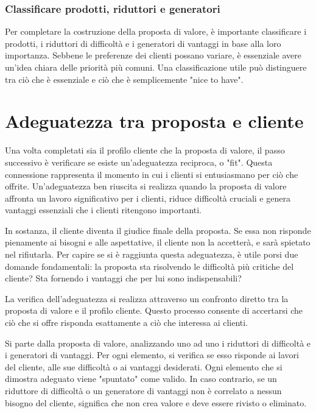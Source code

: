 \subsubsection{Classificare prodotti, riduttori e generatori}
Per completare la costruzione della proposta di valore, è importante classificare i prodotti, i riduttori di difficoltà e i generatori di vantaggi in base alla loro importanza. Sebbene le preferenze dei clienti possano variare, è essenziale avere un'idea chiara delle priorità più comuni. Una classificazione utile può distinguere tra ciò che è essenziale e ciò che è semplicemente "nice to have".

\section{Adeguatezza tra proposta e cliente}
Una volta completati sia il profilo cliente che la proposta di valore, il passo successivo è verificare se esiste un'adeguatezza reciproca, o "fit". Questa connessione rappresenta il momento in cui i clienti si entusiasmano per ciò che offrite. Un'adeguatezza ben riuscita si realizza quando la proposta di valore affronta un lavoro significativo per i clienti, riduce difficoltà cruciali e genera vantaggi essenziali che i clienti ritengono importanti.

In sostanza, il cliente diventa il giudice finale della proposta. Se essa non risponde pienamente ai bisogni e alle aspettative, il cliente non la accetterà, e sarà spietato nel rifiutarla. Per capire se si è raggiunta questa adeguatezza, è utile porsi due domande fondamentali: la proposta sta risolvendo le difficoltà più critiche del cliente? Sta fornendo i vantaggi che per lui sono indispensabili?

La verifica dell’adeguatezza si realizza attraverso un confronto diretto tra la proposta di valore e il profilo cliente. Questo processo consente di accertarsi che ciò che si offre risponda esattamente a ciò che interessa ai clienti.

Si parte dalla proposta di valore, analizzando uno ad uno i riduttori di difficoltà e i generatori di vantaggi. Per ogni elemento, si verifica se esso risponde ai lavori del cliente, alle sue difficoltà o ai vantaggi desiderati. Ogni elemento che si dimostra adeguato viene "spuntato" come valido. In caso contrario, se un riduttore di difficoltà o un generatore di vantaggi non è correlato a nessun bisogno del cliente, significa che non crea valore e deve essere rivisto o eliminato.

